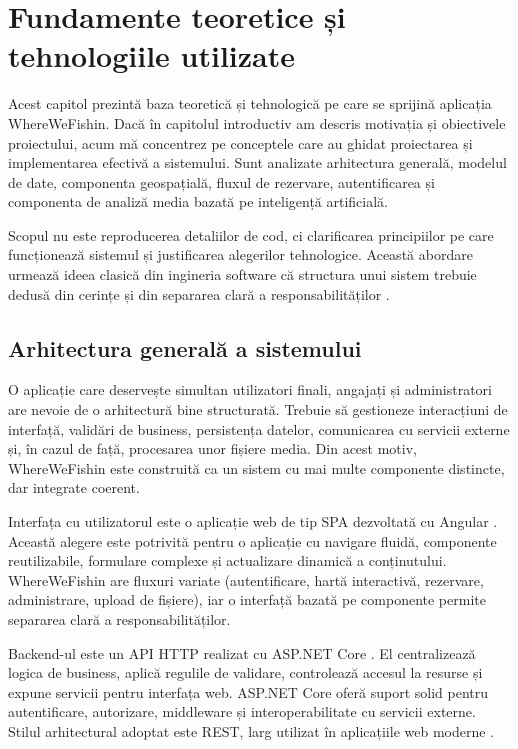 ﻿\chapter{Fundamente teoretice și tehnologiile utilizate}

Acest capitol prezintă baza teoretică și tehnologică pe care se sprijină aplicația WhereWeFishin. Dacă în capitolul introductiv am descris motivația și obiectivele proiectului, acum mă concentrez pe conceptele care au ghidat proiectarea și implementarea efectivă a sistemului. Sunt analizate arhitectura generală, modelul de date, componenta geospațială, fluxul de rezervare, autentificarea și componenta de analiză media bazată pe inteligență artificială.

Scopul nu este reproducerea detaliilor de cod, ci clarificarea principiilor pe care funcționează sistemul și justificarea alegerilor tehnologice. Această abordare urmează ideea clasică din ingineria software că structura unui sistem trebuie dedusă din cerințe și din separarea clară a responsabilităților \citep{sommerville2015,pressman2014,bass2012}.

\section{Arhitectura generală a sistemului}

O aplicație care deservește simultan utilizatori finali, angajați și administratori are nevoie de o arhitectură bine structurată. Trebuie să gestioneze interacțiuni de interfață, validări de business, persistența datelor, comunicarea cu servicii externe și, în cazul de față, procesarea unor fișiere media. Din acest motiv, WhereWeFishin este construită ca un sistem cu mai multe componente distincte, dar integrate coerent.

Interfața cu utilizatorul este o aplicație web de tip SPA dezvoltată cu Angular \citep{angular}. Această alegere este potrivită pentru o aplicație cu navigare fluidă, componente reutilizabile, formulare complexe și actualizare dinamică a conținutului. WhereWeFishin are fluxuri variate (autentificare, hartă interactivă, rezervare, administrare, upload de fișiere), iar o interfață bazată pe componente permite separarea clară a responsabilităților.

Backend-ul este un API HTTP realizat cu ASP.NET Core \citep{aspnetcore}. El centralizează logica de business, aplică regulile de validare, controlează accesul la resurse și expune servicii pentru interfața web. ASP.NET Core oferă suport solid pentru autentificare, autorizare, middleware și interoperabilitate cu servicii externe. Stilul arhitectural adoptat este REST, larg utilizat în aplicațiile web moderne \citep{fielding2000}.

